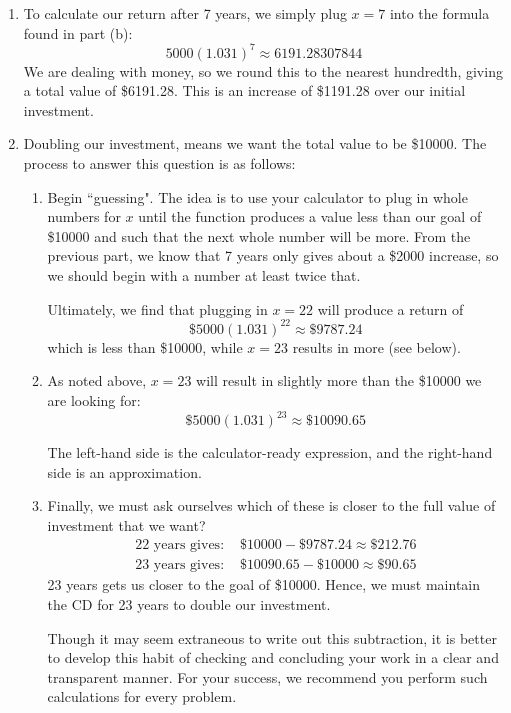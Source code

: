\documentclass{ximera}
\begin{document}
\begin{explanation}
\begin{enumerate}
\item To calculate our return after 7 years, we simply plug $x=7$ into the formula found in part (b):
\begin{equation*}
5000(1.031)^7 \approx 6191.28307844
\end{equation*}
We are dealing with money, so we round this to the nearest hundredth, giving a total value of \$6191.28. This is an increase of \$1191.28 over our initial investment.

\item Doubling our investment, means we want the total value to be \$10000. The process to answer this question is as follows:
\begin{enumerate}
\item Begin ``guessing". The idea is to use your calculator to plug in whole numbers for $x$ until the function produces a value less than our goal of \$10000 and such that the next whole number will be more. From the previous part, we know that 7 years only gives about a \$2000 increase, so we should begin with a number at least twice that.

Ultimately, we find that plugging in $x =22$ will produce a return of
%
\begin{equation*}
 \$5000(1.031)^{22} \approx \$9787.24
\end{equation*}
which is less than \$10000, while $x= 23$ results in more (see below).

\item As noted above, $x=23$ will result in slightly more than the \$10000 we are looking for:
%
\begin{equation*}
\$5000(1.031)^{23} \approx \$10090.65
\end{equation*}

The left-hand side is the calculator-ready expression, and the right-hand side is an approximation.

\item Finally, we must ask ourselves which of these is closer to the full value of investment that we want? 
%
\begin{align*}
\text{22 years gives: } &\$10000 - \$9787.24 \approx \$212.76\\
\text{23 years gives: } &\$10090.65 - \$10000 \approx \$90.65
\end{align*}
%
23 years gets us closer to the goal of \$10000. Hence, we must maintain the CD for 23 years to double our investment.

Though it may seem extraneous to write out this subtraction, it is better to develop this habit of checking and concluding your work in a clear and transparent manner. For your success, we recommend you perform such calculations for every problem.
\end{enumerate}

\end{enumerate}
\end{explanation}
\end{document}
